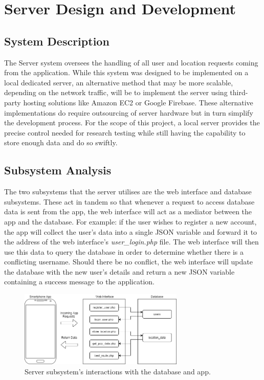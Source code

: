 \section{Server Design and Development}

\subsection{System Description}
The Server system oversees the handling of all user and location requests coming from the application. While this system was designed to be implemented on a local dedicated server, an alternative method that may be more scalable, depending on the network traffic, will be to implement the server using third-party hosting solutions like Amazon EC2 or Google Firebase. These alternative implementations do require outsourcing of server hardware but in turn simplify the development process. For the scope of this project, a local server provides the precise control needed for research testing while still having the capability to store enough data and do so swiftly. 

\subsection{Subsystem Analysis}
The two subsystems that the server utilises are the web interface and database subsystems. These act in tandem so that whenever a request to access database data is sent from the app, the web interface will act as a mediator between the app and the database. For example: if the user wishes to register a new account, the app will collect the user's data into a single JSON variable and forward it to the address of the web interface's \textit{user\_login.php} file. The web interface will then use this data to query the database in order to determine whether there is a conflicting username. Should there be no conflict, the web interface will update the database with the new user's details and return a new JSON variable containing a success message to the application.

\begin{figure}[ht]
    \centering
    \includegraphics[width=0.7\textwidth]{figures/ServerSubsystemInteraction.png}
    \caption{Server subsystem's interactions with the database and app.}
    \label{fig:server_subsystem_interaction}
\end{figure}

